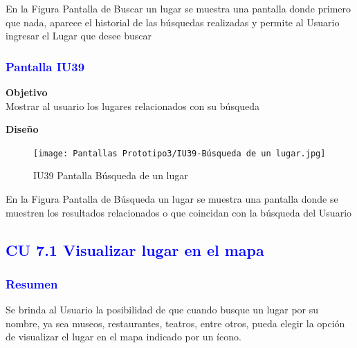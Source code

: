 En la Figura Pantalla de Buscar un lugar se muestra una pantalla donde primero que nada, aparece el historial de las búsquedas realizadas y permite al Usuario ingresar el Lugar que desee buscar

\subsubsection{\textcolor{blue}{Pantalla IU39}}

\textbf{Objetivo} \\
Mostrar al usuario los lugares relacionados con su búsqueda
\vspace{15pt}

\textbf{Diseño}

    \begin{figure}[h]
        
            \centering
            \texttt{[image: Pantallas Prototipo3/IU39-Búsqueda de un lugar.jpg]}
        \caption{IU39 Pantalla Búsqueda de un lugar}
    
    \end{figure}

En la Figura Pantalla de Búsqueda un lugar se muestra una pantalla donde se muestren los resultados relacionados o que coincidan con la búsqueda del Usuario


\newpage
\subsection{\textcolor{blue}{CU 7.1 Visualizar lugar en el mapa}}

\subsubsection{\textcolor{blue}{Resumen}}
Se brinda al Usuario la posibilidad de que cuando busque un lugar por su nombre, ya sea museos, restaurantes, teatros, entre otros, pueda elegir la opción de visualizar el lugar en el mapa indicado por un ícono.

